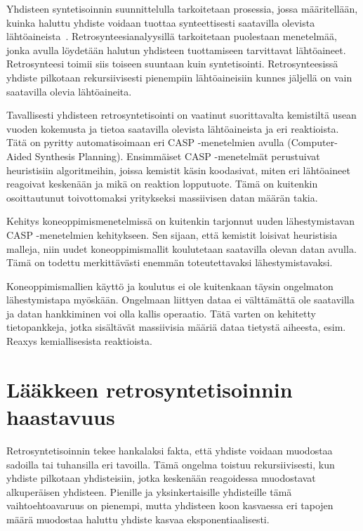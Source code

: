 \documentclass[finnish,twoside,censored,tkt,sw-line]{HYthesisML}
\begin{document}
Yhdisteen syntetisoinnin suunnittelulla tarkoitetaan prosessia, jossa määritellään, kuinka haluttu yhdiste voidaan tuottaa synteettisesti saatavilla olevista lähtöaineista~\cite{ColeyConnorW2018MLiC}.
Retrosynteesianalyysillä tarkoitetaan puolestaan menetelmää, jonka avulla löydetään halutun yhdisteen tuottamiseen tarvittavat lähtöaineet.
Retrosynteesi toimii siis toiseen suuntaan kuin syntetisointi.
Retrosynteesissä yhdiste pilkotaan rekursiivisesti pienempiin lähtöaineisiin kunnes jäljellä on vain saatavilla olevia lähtöaineita.

Tavallisesti yhdisteen retrosyntetisointi on vaatinut suorittavalta kemistiltä usean vuoden kokemusta ja tietoa saatavilla olevista lähtöaineista ja eri reaktioista.
Tätä on pyritty automatisoimaan eri CASP -menetelmien avulla (Computer-Aided Synthesis Planning).
Ensimmäiset CASP -menetelmät perustuivat heuristisiin algoritmeihin, joissa kemistit käsin koodasivat, miten eri lähtöaineet reagoivat keskenään ja mikä on reaktion lopputuote.
Tämä on kuitenkin osoittautunut toivottomaksi yritykseksi massiivisen datan määrän takia.

Kehitys koneoppimismenetelmissä on kuitenkin tarjonnut uuden lähestymistavan CASP -menetelmien kehitykseen.
Sen sijaan, että kemistit loisivat heuristisia malleja, niin uudet koneoppimismallit koulutetaan saatavilla olevan datan avulla.
Tämä on todettu merkittävästi enemmän toteutettavaksi lähestymistavaksi.

Koneoppimismallien käyttö ja koulutus ei ole kuitenkaan täysin ongelmaton lähestymistapa myöskään.
Ongelmaan liittyen dataa ei välttämättä ole saatavilla ja datan hankkiminen voi olla kallis operaatio.
Tätä varten on kehitetty tietopankkeja, jotka sisältävät massiivisia määriä dataa tietystä aiheesta, esim. Reaxys kemiallisesista reaktioista.


\section{Lääkkeen retrosyntetisoinnin haastavuus}

Retrosyntetisoinnin tekee hankalaksi fakta, että yhdiste voidaan muodostaa sadoilla tai tuhansilla eri tavoilla.
Tämä ongelma toistuu rekursiivisesti, kun yhdiste pilkotaan yhdisteisiin, jotka keskenään reagoidessa muodostavat alkuperäisen yhdisteen.
Pienille ja yksinkertaisille yhdisteille tämä vaihtoehtoavaruus on pienempi, mutta yhdisteen koon kasvaessa eri tapojen määrä muodostaa haluttu yhdiste kasvaa eksponentiaalisesti.
\end{document}
